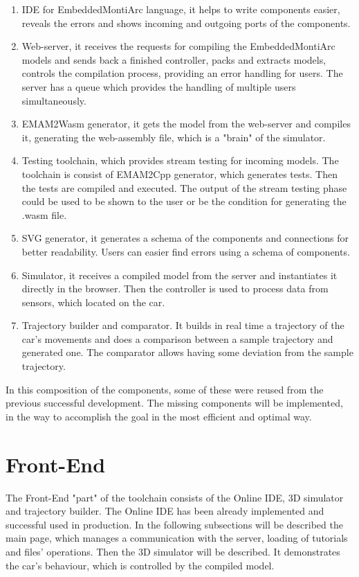 \begin{enumerate}
    \item IDE for EmbeddedMontiArc language, it helps to write components easier, reveals the errors and shows incoming and outgoing ports of the components.
    \item Web-server, it receives the requests for compiling the EmbeddedMontiArc models and sends back a finished controller,  packs and extracts models, controls the compilation process, providing an error handling for users. The server has a queue which provides the handling of multiple users simultaneously.
    \item EMAM2Wasm generator, it gets the model from the web-server and compiles it, generating the web-assembly file, which is a "brain" of the simulator.
    \item Testing toolchain, which provides stream testing for incoming models. The toolchain is consist of EMAM2Cpp generator, which generates tests. Then the tests are compiled and executed. The output of the stream testing phase could be used to be shown to the user or be the condition for generating the .wasm file.
    \item SVG generator, it generates a schema of the components and connections for better readability. Users can easier find errors using a schema of components.
    \item Simulator, it receives a compiled model from the server and instantiates it directly in the browser. Then the controller is used to process data from sensors, which located on the car.
    \item Trajectory builder and comparator. It builds in real time a trajectory of the car's movements and does a comparison between a sample trajectory and generated one. The comparator allows having some deviation from the sample trajectory.
\end{enumerate}
In this composition of the components, some of these were reused from the previous successful development. The missing components will be implemented, in the way to accomplish the goal in the most efficient and optimal way.
\section{Front-End}
The Front-End "part" of the toolchain consists of the Online IDE, 3D simulator and trajectory builder. The Online IDE has been already implemented and successful used in production. In the following subsections will be described the main page, which manages a communication with the server, loading of tutorials and files' operations. Then the 3D simulator will be described. It demonstrates the car's behaviour, which is controlled by the compiled model. 
